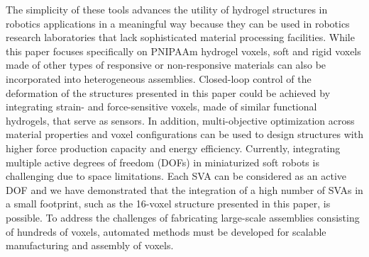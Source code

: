 The simplicity of these tools advances the utility of hydrogel structures in robotics applications in a meaningful way because they can be used in robotics research laboratories that lack sophisticated material processing facilities.
While this paper focuses specifically on PNIPAAm hydrogel voxels, soft and rigid voxels made of other types of responsive or non-responsive materials can also be incorporated into heterogeneous assemblies. Closed-loop control of the deformation of the structures presented in this paper could be achieved by integrating strain- and force-sensitive voxels, made of similar functional hydrogels, that serve as sensors. In addition, multi-objective optimization across material properties and voxel configurations can be used to design structures with higher force production capacity and %
energy efficiency. Currently, integrating multiple active degrees of freedom (DOFs) in miniaturized soft robots is challenging due to space limitations. Each SVA can be considered as an active DOF and we have demonstrated that the integration of a high number of SVAs in a small footprint, such as the 16-voxel structure presented in this paper, is possible. To address the challenges of fabricating large-scale 
assemblies consisting of hundreds of voxels, %
automated methods must be developed for scalable manufacturing and assembly of voxels.